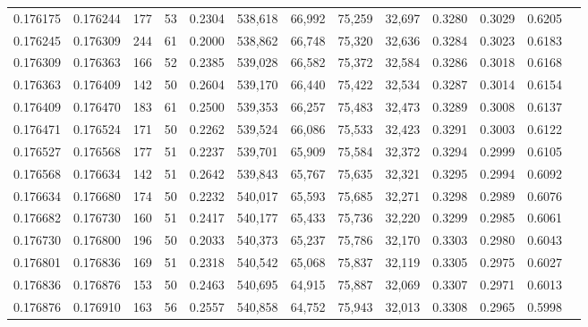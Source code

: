 \begin{tabular}{rrrrrrrrrrrrr}
0.176175 & 0.176244 &   177 &  53 &                                     0.2304 & 538,618 &  66,992 &  75,259 &  32,697 & 0.3280 & 0.3029 & 0.6205 \\
0.176245 & 0.176309 &   244 &  61 &                                     0.2000 & 538,862 &  66,748 &  75,320 &  32,636 & 0.3284 & 0.3023 & 0.6183 \\
0.176309 & 0.176363 &   166 &  52 &                                     0.2385 & 539,028 &  66,582 &  75,372 &  32,584 & 0.3286 & 0.3018 & 0.6168 \\
0.176363 & 0.176409 &   142 &  50 &                                     0.2604 & 539,170 &  66,440 &  75,422 &  32,534 & 0.3287 & 0.3014 & 0.6154 \\
0.176409 & 0.176470 &   183 &  61 &                                     0.2500 & 539,353 &  66,257 &  75,483 &  32,473 & 0.3289 & 0.3008 & 0.6137 \\
0.176471 & 0.176524 &   171 &  50 &                                     0.2262 & 539,524 &  66,086 &  75,533 &  32,423 & 0.3291 & 0.3003 & 0.6122 \\
0.176527 & 0.176568 &   177 &  51 &                                     0.2237 & 539,701 &  65,909 &  75,584 &  32,372 & 0.3294 & 0.2999 & 0.6105 \\
0.176568 & 0.176634 &   142 &  51 &                                     0.2642 & 539,843 &  65,767 &  75,635 &  32,321 & 0.3295 & 0.2994 & 0.6092 \\
0.176634 & 0.176680 &   174 &  50 &                                     0.2232 & 540,017 &  65,593 &  75,685 &  32,271 & 0.3298 & 0.2989 & 0.6076 \\
0.176682 & 0.176730 &   160 &  51 &                                     0.2417 & 540,177 &  65,433 &  75,736 &  32,220 & 0.3299 & 0.2985 & 0.6061 \\
0.176730 & 0.176800 &   196 &  50 &                                     0.2033 & 540,373 &  65,237 &  75,786 &  32,170 & 0.3303 & 0.2980 & 0.6043 \\
0.176801 & 0.176836 &   169 &  51 &                                     0.2318 & 540,542 &  65,068 &  75,837 &  32,119 & 0.3305 & 0.2975 & 0.6027 \\
0.176836 & 0.176876 &   153 &  50 &                                     0.2463 & 540,695 &  64,915 &  75,887 &  32,069 & 0.3307 & 0.2971 & 0.6013 \\
0.176876 & 0.176910 &   163 &  56 &                                     0.2557 & 540,858 &  64,752 &  75,943 &  32,013 & 0.3308 & 0.2965 & 0.5998 \\

\end{tabular}
